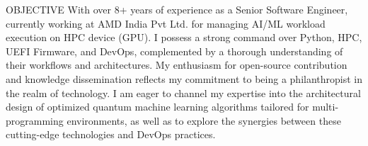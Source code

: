 \documentclass{resume} %
\begin{document}
\def\profile{0}


\begin{rSection}{OBJECTIVE}
{With over 8+ years of experience as a Senior Software Engineer, currently working at AMD India Pvt Ltd. for managing AI/ML workload execution on HPC device (GPU). I possess a strong command over Python, HPC, UEFI Firmware, and DevOps, complemented by a thorough understanding of their workflows and architectures. My enthusiasm for open-source contribution and knowledge dissemination reflects my commitment to being a philanthropist in the realm of technology. I am eager to channel my expertise into the architectural design of optimized quantum machine learning algorithms tailored for multi-programming environments, as well as to explore the synergies between these cutting-edge technologies and DevOps practices.}

\end{rSection}




\end{document}
